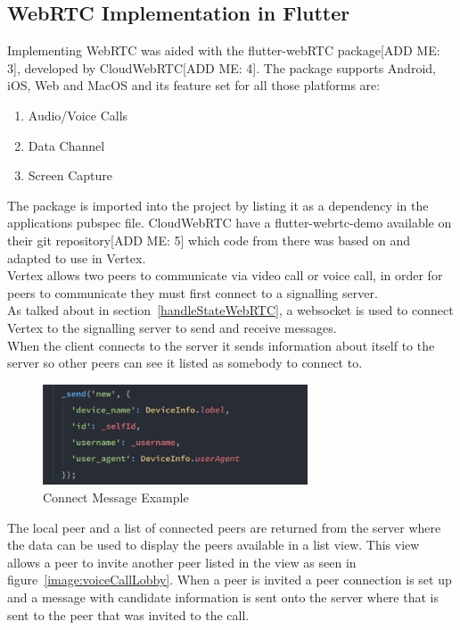 \subsection{WebRTC Implementation in Flutter}
Implementing WebRTC was aided with the flutter-webRTC package[ADD ME: 3], developed by CloudWebRTC[ADD ME: 4]. The package supports Android, iOS, Web and MacOS and its feature set for all those platforms are:
\begin{enumerate}
    \item Audio/Voice Calls
    \item Data Channel
    \item Screen Capture
\end{enumerate}
The package is imported into the project by listing it as a dependency in the applications pubspec file. CloudWebRTC have a flutter-webrtc-demo available on their git repository[ADD ME: 5] which code from there was based on and adapted to use in Vertex.
\\ Vertex allows two peers to communicate via video call or voice call, in order for peers to communicate they must first connect to a signalling server.
\\ As talked about in section~\ref{handleStateWebRTC}, a websocket is used to connect Vertex to the signalling server to send and receive messages. 
\\ When the client connects to the server it sends information about itself to the server so other peers can see it listed as somebody to connect to. 

\begin{figure}[h!]
    \caption{Connect Message Example}
    \label{image:connectMessageExample}
    \centering
    \includegraphics[width=0.7\textwidth]{images/new_connnect_message.png}
\end{figure}

The local peer and a list of connected peers are returned from the server where the data can be used to display the peers available in a list view. This view allows a peer to invite another peer listed in the view as seen in figure~\ref{image:voiceCallLobby}. When a peer is invited a peer connection is set up and a message with candidate information is sent onto the server where that is sent to the peer that was invited to the call.

